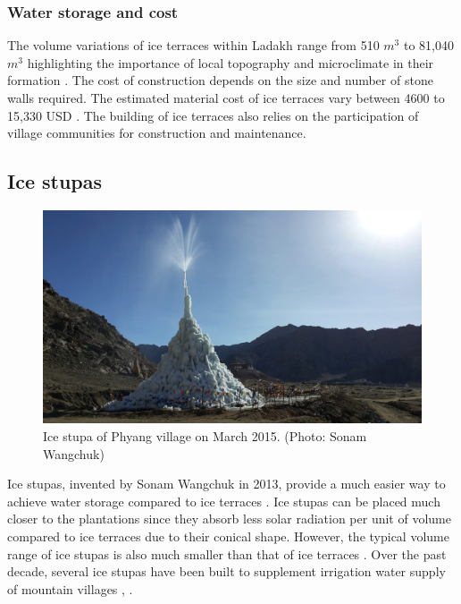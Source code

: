 \subsubsection{Water storage and cost}

The volume variations of ice terraces within Ladakh range from 510 $m^3$ to 81,040 $m^3$ highlighting
the importance of local topography and microclimate in their formation
\citep{nusserSociohydrologyArtificialGlaciers2019, norphelSnowWaterHarvesting2015}. The cost of construction
depends on the size and number of stone walls required. The estimated material cost of ice terraces vary between
4600 to 15,330 USD \citep{nusserSociohydrologyArtificialGlaciers2019}. The building of ice terraces also relies
on the participation of village communities for construction and maintenance.

\subsection{Ice stupas}

\begin{figure}[htb]
	\centering
	\includegraphics[width=\textwidth]{figs/IS_example.jpg}
	\caption{Ice stupa of Phyang village on March 2015. (Photo: Sonam Wangchuk)}
	\label{fig:ISexample}
\end{figure}

Ice stupas, invented by Sonam Wangchuk in 2013, provide a much easier way to achieve water storage compared to
ice terraces \citep{wangchukIceStupaArtificial2014}. Ice stupas can be placed much closer to the plantations
since they absorb less solar radiation per unit of volume compared to ice terraces due to their conical shape.
However, the typical volume range of ice stupas is also much smaller than that of ice terraces
\citep{nusserSociohydrologyArtificialGlaciers2019}. Over the past decade, several ice stupas have been built to
supplement irrigation water supply of mountain villages \citep{wangchukIceStupaCompetition2020,
palmerStoringFrozenWater2022, aggarwalAdaptationClimateChange2021}, .


